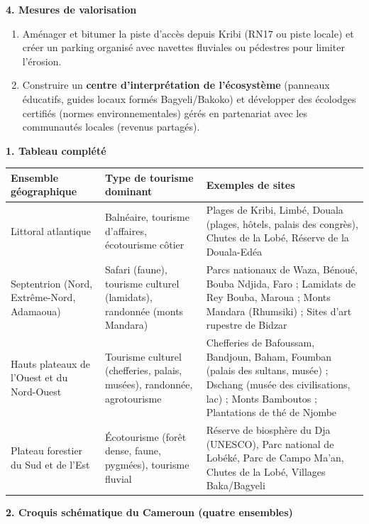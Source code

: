 \documentclass[11pt]{article}
\begin{document}
\begin{corrige}
\textbf{4. Mesures de valorisation}
\begin{enumerate}
\item Aménager et bitumer la piste d'accès depuis Kribi (RN17 ou piste locale) et créer un parking organisé avec navettes fluviales ou pédestres pour limiter l'érosion.
\item Construire un \textbf{centre d'interprétation de l'écosystème} (panneaux éducatifs, guides locaux formés Bagyeli/Bakoko) et développer des écolodges certifiés (normes environnementales) gérés en partenariat avec les communautés locales (revenus partagés).
\end{enumerate}
\end{corrige}

\begin{corrige}
\textbf{1. Tableau complété}

\begin{center}
\begin{tabularx}{\linewidth}{|l|X|X|}\hline
\rowcolor{popblueL} \textbf{Ensemble géographique} & \textbf{Type de tourisme dominant} & \textbf{Exemples de sites} \\ \hline
Littoral atlantique & Balnéaire, tourisme d'affaires, écotourisme côtier & Plages de Kribi, Limbé, Douala (plages, hôtels, palais des congrès), Chutes de la Lobé, Réserve de la Douala-Edéa \\ \hline
Septentrion (Nord, Extrême-Nord, Adamaoua) & Safari (faune), tourisme culturel (lamidats), randonnée (monts Mandara) & Parcs nationaux de Waza, Bénoué, Bouba Ndjida, Faro ; Lamidats de Rey Bouba, Maroua ; Monts Mandara (Rhumsiki) ; Sites d'art rupestre de Bidzar \\ \hline
Hauts plateaux de l'Ouest et du Nord-Ouest & Tourisme culturel (chefferies, palais, musées), randonnée, agrotourisme & Chefferies de Bafoussam, Bandjoun, Baham, Foumban (palais des sultans, musée) ; Dschang (musée des civilisations, lac) ; Monts Bamboutos ; Plantations de thé de Njombe \\ \hline
Plateau forestier du Sud et de l'Est & Écotourisme (forêt dense, faune, pygmées), tourisme fluvial & Réserve de biosphère du Dja (UNESCO), Parc national de Lobéké, Parc de Campo Ma'an, Chutes de la Lobé, Villages Baka/Bagyeli \\ \hline
\end{tabularx}
\end{center}

\textbf{2. Croquis schématique du Cameroun (quatre ensembles)}


\end{corrige}
\end{document}
